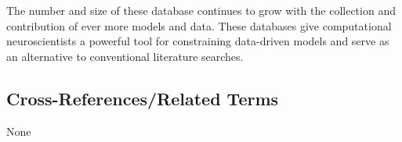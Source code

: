\documentclass[12pt]{article}
\begin{document}
The number and size of these database continues to grow with the collection and contribution of ever more models and data.  
These databases give computational neuroscientists a powerful tool for constraining data-driven models and serve as an alternative to conventional literature searches.  

\subsection*{Cross-References/Related Terms}
None



\end{document}
